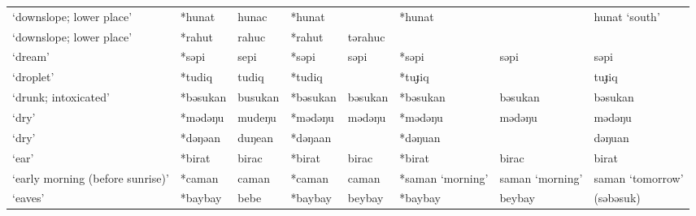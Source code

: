 \begin{landscape}
\begin{longtable}[c]{@{}p{3cm}<{\raggedright}p{2.75cm}<{\raggedright}p{2.75cm}<{\raggedright}p{2.75cm}<{\raggedright}p{2.75cm}<{\raggedright}p{2.75cm}<{\raggedright}p{2.75cm}<{\raggedright}p{2.75cm}<{\raggedright}@{}}
`downslope; lower place'                             & *hunat             & hunac                          & *hunat             &                            & *hunat           &                          & hunat `south'                     \\
`downslope; lower place'                             & *rahut             & rahuc                          & *rahut             & tərahuc                    &                  &                          &                                   \\
`dream'                                              & *səpi              & sepi                           & *səpi              & səpi                       & *səpi            & səpi                     & səpi                              \\
`droplet'                                            & *tudiq             & tudiq                          & *tudiq             &                            & *tuɟiq           &                          & tuɟiq                             \\
`drunk; intoxicated'                                 & *bəsukan           & busukan                        & *bəsukan           & bəsukan                    & *bəsukan         & bəsukan                  & bəsukan                           \\
`dry'                                                & *mədəŋu            & mudeŋu                         & *mədəŋu            & mədəŋu                     & *mədəŋu          & mədəŋu                   & mədəŋu                            \\
`dry'                                                & *dəŋəan            & duŋean                         & *dəŋaan            &                            & *dəŋuan          &                          & dəŋuan                            \\
`ear'                                                & *birat             & birac                          & *birat             & birac                      & *birat           & birac                    & birat                             \\
`early morning (before sunrise)'                     & *caman             & caman                          & *caman             & caman                      & *saman `morning' & saman `morning'          & saman `tomorrow'                  \\
`eaves'                                              & *baybay            & bebe                           & *baybay            & beybay                     & *baybay          & beybay                   & (səbəsuk)                         \\

\end{longtable}
\end{landscape}
